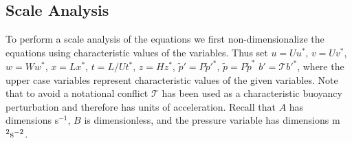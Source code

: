 \documentclass[times]{qjrms4}
\begin{document}
\subsection{Scale Analysis} \label{sec:scale_anal}

To perform a scale analysis of the equations we first non-dimensionalize the equations
using characteristic values of the variables. Thus set 
$ u = U u^*$, $ v = U v^*$, $ w = W w^*$,
$x = L x^*$, $t = L/U t^*$, $z = H z^*$, $\tilde{p}' = P \tilde{p}'^*$, $\tilde{p} = P \tilde{p}^*$ 
$b' = \mathcal T b'^*$, where the upper case variables represent characteristic values of the 
given variables. Note that to avoid a notational conflict $\mathcal T$ has been used as a characteristic
buoyancy perturbation and therefore has units of acceleration. 
Recall that $A$ has dimensions s$^{-1}$, $B$ is dimensionless, and the pressure variable has dimensions m$^2 \rm{s}^{-2}$.
\end{document}
